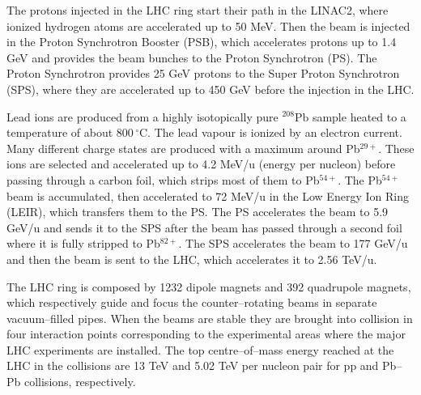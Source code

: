 The protons injected in the LHC ring start their path in the LINAC2, where ionized hydrogen
atoms are accelerated up to 50 MeV. Then the beam is injected in the Proton Synchrotron Booster 
(PSB), which accelerates protons up to 1.4 GeV and provides the beam bunches to the Proton 
Synchrotron (PS). The Proton Synchrotron provides 25 GeV protons to the Super Proton Synchrotron
(SPS), where they are accelerated up to 450 GeV before the injection in the LHC.

Lead ions are produced from a highly isotopically pure $^{208}$Pb sample heated to a temperature
of about $800\,^{\circ}\mathrm{C}$.
The lead vapour is ionized by an electron current. Many different charge states are produced
with a maximum around Pb$^{29+}$.
These ions are selected and accelerated up to 4.2 MeV/u (energy per nucleon) before passing through
a carbon foil, which strips most of them to Pb$^{54+}$. The Pb$^{54+}$ beam is accumulated, then
accelerated to 72 MeV/u in the Low Energy Ion Ring (LEIR), which transfers them to the PS.
The PS accelerates the beam to 5.9 GeV/u and sends it to the SPS after the beam has passed through a second foil where it is fully stripped to Pb$^{82+}$. 
The SPS accelerates the beam to 177 GeV/u and then the beam is sent to the LHC, which accelerates it to 2.56 TeV/u.

The LHC ring is composed by 1232 dipole magnets and 392 quadrupole magnets, which respectively 
guide and focus the counter–rotating beams in separate vacuum–filled pipes.
When the beams are stable they are brought into collision in four interaction points corresponding
to the experimental areas where the major LHC experiments are installed.
The top centre–of–mass energy reached at the LHC in the collisions are 13 TeV and 5.02 TeV per 
nucleon pair for pp and Pb--Pb collisions, respectively.

